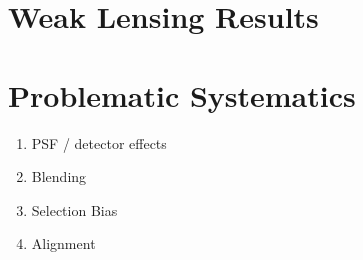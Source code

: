 \documentclass{article}
\begin{document}
\section{Weak Lensing Results}
\cite{Subaru_2019}

\section{Problematic Systematics}
\cite{massey_2013}

\begin{enumerate}
    \item PSF / detector effects 
    \item Blending
    \item Selection Bias
    \item Alignment 
\end{enumerate}



\end{document}
